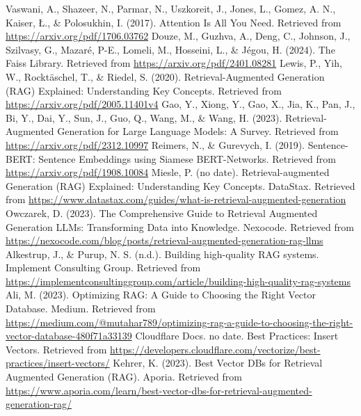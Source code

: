 \documentclass{wseas}
\begin{document}
\begin{thebibliography}{9}
 Vaswani, A., Shazeer, N., Parmar, N., Uszkoreit, J., Jones, L., Gomez, A. N., Kaiser, Ł., \& Polosukhin, I. (2017). Attention Is All You Need. Retrieved from \url{https://arxiv.org/pdf/1706.03762}
  Douze, M., Guzhva, A., Deng, C., Johnson, J., Szilvasy, G., Mazaré,
  P-E., Lomeli, M., Hosseini, L., \& Jégou, H. (2024). The Faiss
  Library. Retrieved from \url{https://arxiv.org/pdf/2401.08281}
  Lewis, P., Yih, W., Rocktäschel, T., \& Riedel, S. (2020).
  Retrieval-Augmented Generation (RAG) Explained: Understanding Key
  Concepts. Retrieved from \url{https://arxiv.org/pdf/2005.11401v4}
  Gao, Y., Xiong, Y., Gao, X., Jia, K., Pan, J., Bi, Y., Dai, Y., Sun,
  J., Guo, Q., Wang, M., \& Wang, H. (2023). Retrieval-Augmented
  Generation for Large Language Models: A Survey. Retrieved from
  \url{https://arxiv.org/pdf/2312.10997}
  Reimers, N., \& Gurevych, I. (2019). Sentence-BERT: Sentence
  Embeddings using Siamese BERT-Networks. Retrieved from
  \url{https://arxiv.org/pdf/1908.10084}
  Miesle, P. (no date). Retrieval-augmented Generation (RAG) Explained:
  Understanding Key Concepts. DataStax. Retrieved from
  \url{https://www.datastax.com/guides/what-is-retrieval-augmented-generation}
  Owczarek, D. (2023). The Comprehensive Guide to Retrieval Augmented
  Generation LLMs: Transforming Data into Knowledge. Nexocode. Retrieved
  from
  \url{https://nexocode.com/blog/posts/retrieval-augmented-generation-rag-llms}
  Alkestrup, J., \& Purup, N. S. (n.d.). Building high-quality RAG
  systems. Implement Consulting Group. Retrieved from
  \url{https://implementconsultinggroup.com/article/building-high-quality-rag-systems}
  Ali, M. (2023). Optimizing RAG: A Guide to Choosing the Right Vector
  Database. Medium. Retrieved from
  \href{https://medium.com/@mutahar789/optimizing-rag-a-guide-to-choosing-the-right-vector-database-480f71a33139}{https://medium.com/@mutahar789/optimizing-rag-a-guide-to-choosing-the-right-vector-database-480f71a33139}
  Cloudflare Docs. no date. Best Practices: Insert Vectors. Retrieved
  from
  \url{https://developers.cloudflare.com/vectorize/best-practices/insert-vectors/}
  Kehrer, K. (2023). Best Vector DBs for Retrieval Augmented Generation
  (RAG). Aporia. Retrieved from
  \url{https://www.aporia.com/learn/best-vector-dbs-for-retrieval-augmented-generation-rag/}

\end{thebibliography}
\end{document}
